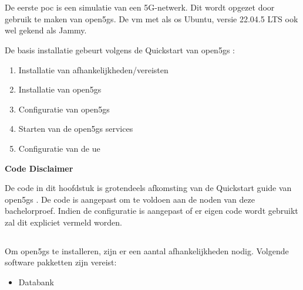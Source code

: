 \chapter{}%
\label{ch:poc1}

De eerste \gls{poc} is een simulatie van een 5G-netwerk. Dit wordt opgezet door gebruik te maken van \gls{open5gs}. De \gls{vm} met als \gls{os} Ubuntu, versie 22.04.5 LTS ook wel gekend als Jammy.

De basis installatie gebeurt volgens de Quickstart van \gls{open5gs} \textcite{Lee2025a}:

\begin{enumerate}
    \item Installatie van afhankelijkheden/vereisten
    \item Installatie van \gls{open5gs}
    \item Configuratie van \gls{open5gs}
    \item Starten van de \gls{open5gs} services
    \item Configuratie van de \gls{ue}
\end{enumerate}

\begin{center}
    \large\textbf{Code Disclaimer}
\end{center}

\vspace{0.5cm}

\noindent De code in dit hoofdstuk is grotendeels afkomsting van de Quickstart guide van \gls{open5gs} \autocite{Lee2025a}. De code is aangepast om te voldoen aan de noden van deze bachelorproef. Indien de configuratie is aangepast of er eigen code wordt gebruikt zal dit expliciet vermeld worden.
\vspace{0.3cm}

\section{}

Om \gls{open5gs} te installeren, zijn er een aantal afhankelijkheden nodig. Volgende software pakketten zijn vereist:

\begin{itemize}
    \item Databank
\end{itemize}

